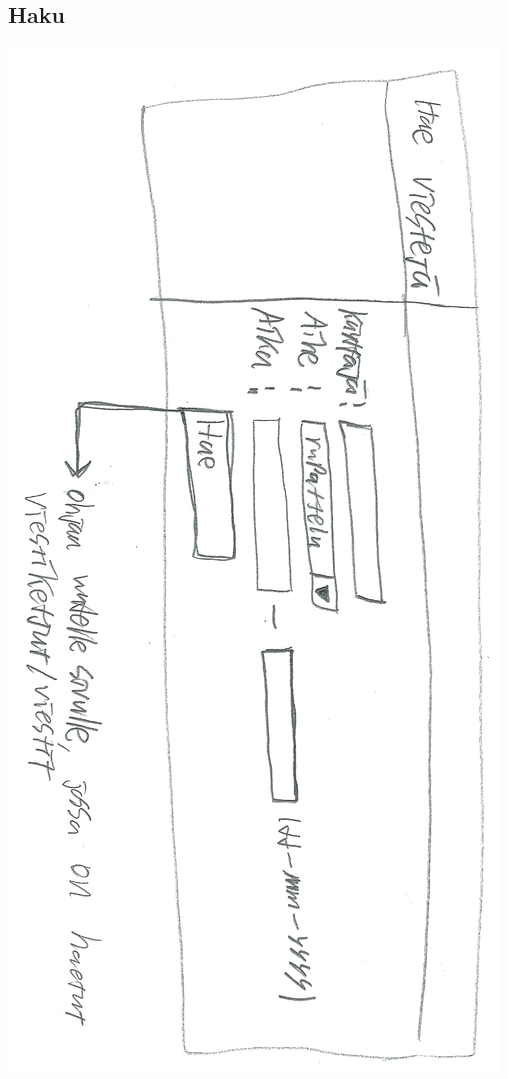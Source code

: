 \documentclass[a4paper, 12pt, finnish]{article}
\begin{document}
\subsection{Haku}
\includegraphics[width=\textwidth,height=\textheight,keepaspectratio]{haku.png}
\end{document}
